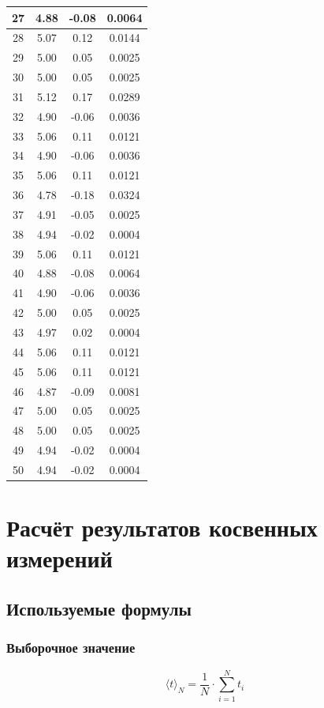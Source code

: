 \documentclass[12pt,a4paper]{article}
\begin{document}
\begin{longtable}{|c|c|c|c|}
    27 & 4.88 & -0.08 & 0.0064 \\
    \hline
    28 & 5.07 & 0.12 & 0.0144 \\
    \hline
    29 & 5.00 & 0.05 & 0.0025 \\
    \hline
    30 & 5.00 & 0.05 & 0.0025 \\
    \hline
    31 & 5.12 & 0.17 & 0.0289 \\
    \hline
    32 & 4.90 & -0.06 & 0.0036 \\
    \hline
    33 & 5.06 & 0.11 & 0.0121 \\
    \hline
    34 & 4.90 & -0.06 & 0.0036 \\
    \hline
    35 & 5.06 & 0.11 & 0.0121 \\
    \hline
    36 & 4.78 & -0.18 & 0.0324 \\
    \hline
    37 & 4.91 & -0.05 & 0.0025 \\
    \hline
    38 & 4.94 & -0.02 & 0.0004 \\
    \hline
    39 & 5.06 & 0.11 & 0.0121 \\
    \hline
    40 & 4.88 & -0.08 & 0.0064 \\
    \hline
    41 & 4.90 & -0.06 & 0.0036 \\
    \hline
    42 & 5.00 & 0.05 & 0.0025 \\
    \hline
    43 & 4.97 & 0.02 & 0.0004 \\
    \hline
    44 & 5.06 & 0.11 & 0.0121 \\
    \hline
    45 & 5.06 & 0.11 & 0.0121 \\
    \hline
    46 & 4.87 & -0.09 & 0.0081 \\
    \hline
    47 & 5.00 & 0.05 & 0.0025 \\
    \hline
    48 & 5.00 & 0.05 & 0.0025 \\
    \hline
    49 & 4.94 & -0.02 & 0.0004 \\
    \hline
    50 & 4.94 & -0.02 & 0.0004 \\
    \hline
\end{longtable}
\section{Расчёт результатов косвенных измерений}
\subsection{Используемые формулы}
\subsubsection{Выборочное значение}
$$\langle t\rangle_N=\frac{1}{N}\cdot \sum_{i=1}^Nt_i$$
\end{document}
